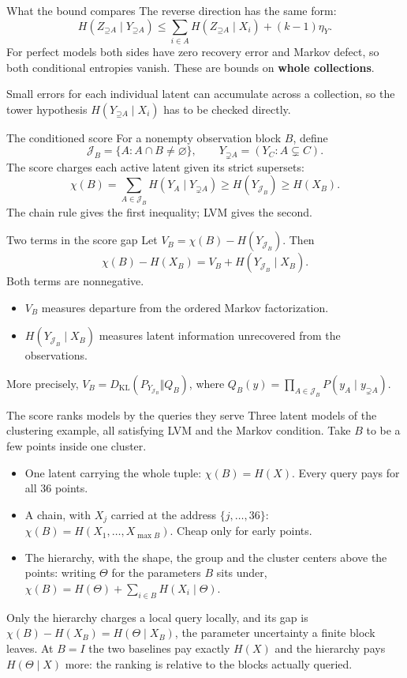 \documentclass[aspectratio=169,12pt]{beamer}
\newcommand{\Up}{\mathord{\supseteq}}
\newcommand{\Upstrict}{\mathord{\supsetneq}}
\begin{document}
\begin{frame}{What the bound compares}
The reverse direction has the same form:
\[
H(Z_{\Up A}\mid Y_{\Up A})
\le\sum_{i\in A}H(Z_{\Up A}\mid X_i)+(k-1)\eta_Y.
\]
For perfect models both sides have zero recovery error and Markov defect,
so both conditional entropies vanish. These are bounds on \textbf{whole collections}.
\medskip

Small errors for each individual latent can accumulate across a collection, so
the tower hypothesis $H(Y_{\Up A}\mid X_i)$ has to be checked directly.
\end{frame}

\begin{frame}{The conditioned score}
For a nonempty observation block $B$, define
\[
\mathcal J_B=\{A:A\cap B\ne\varnothing\},\qquad Y_{\Upstrict A}=(Y_C:A\subsetneq C).
\]
The score charges each active latent given its strict supersets:
\[
\chi(B)=\sum_{A\in\mathcal J_B}H(Y_A\mid Y_{\Upstrict A})
\ge H(Y_{\mathcal J_B})\ge H(X_B).
\]
The chain rule gives the first inequality; LVM gives the second.
\end{frame}

\begin{frame}{Two terms in the score gap}
Let $V_B=\chi(B)-H(Y_{\mathcal J_B})$. Then
\[
\chi(B)-H(X_B)=V_B+H(Y_{\mathcal J_B}\mid X_B).
\]
Both terms are nonnegative.
\begin{itemize}
\item $V_B$ measures departure from the ordered Markov factorization.
\item $H(Y_{\mathcal J_B}\mid X_B)$ measures latent information unrecovered
from the observations.
\end{itemize}
\medskip
\small More precisely, $V_B=D_{\mathrm{KL}}(P_{Y_{\mathcal J_B}}\Vert Q_B)$,
where $Q_B(y)=\prod_{A\in\mathcal J_B}P(y_A\mid y_{\Upstrict A})$.
\end{frame}

\begin{frame}{The score ranks models by the queries they serve}
Three latent models of the clustering example, all satisfying LVM and the
Markov condition. Take $B$ to be a few points inside one cluster.
\begin{itemize}
\item One latent carrying the whole tuple: $\chi(B)=H(X)$. Every query pays
for all 36 points.
\item A chain, with $X_j$ carried at the address $\{j,\ldots,36\}$:
$\chi(B)=H(X_1,\ldots,X_{\max B})$. Cheap only for early points.
\item The hierarchy, with the shape, the group and the cluster centers above
the points: writing $\Theta$ for the parameters $B$ sits under,
$\chi(B)=H(\Theta)+\sum_{i\in B}H(X_i\mid\Theta)$.
\end{itemize}
Only the hierarchy charges a local query locally, and its gap is
$\chi(B)-H(X_B)=H(\Theta\mid X_B)$, the parameter uncertainty a finite block
leaves. At $B=I$ the two baselines pay exactly $H(X)$ and the hierarchy pays
$H(\Theta\mid X)$ more: the ranking is relative to the blocks actually queried.
\end{frame}
\end{document}
